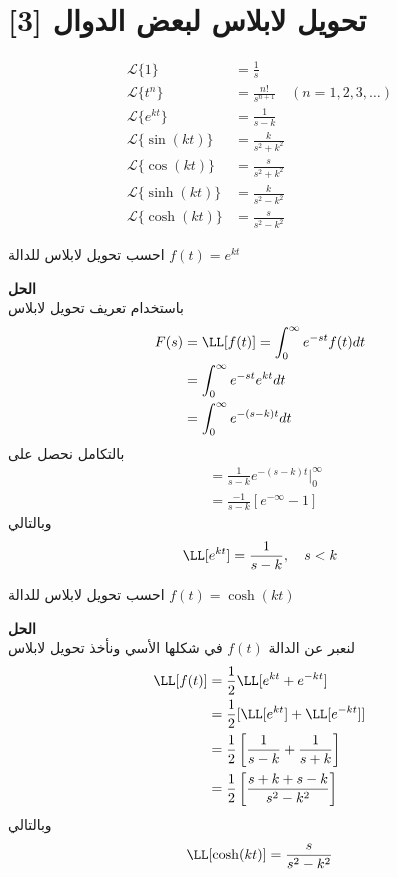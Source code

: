 \section[تحويل لابلاس لبعض الدوال]{تحويل لابلاس لبعض الدوال [3]}
\begin{align}
	\mathcal{L}\{1\}         &= \frac{1}{s}      \\
	\mathcal{L}\{t^n\}       &= \frac{n!}{s^{n+1}}   \quad (n = 1, 2, 3, \dots) \\
	\mathcal{L}\{e^{kt}\}    &= \frac{1}{s-k}        \\
	\mathcal{L}\{\sin(kt)\}  &= \frac{k}{s^2+k^2} \\
	\mathcal{L}\{\cos(kt)\} &= \frac{s}{s^2+k^2}   \\
	\mathcal{L}\{\sinh(kt)\} &= \frac{k}{s^2-k^2}   \\
	\mathcal{L}\{\cosh(kt)\} &= \frac{s}{s^2-k^2}    \
\end{align}

\begin{example}
	احسب تحويل لابلاس للدالة $f(t) = e^{kt}$
\end{example}
\noindent
\textbf{الحل}\\
\noindent
باستخدام تعريف تحويل لابلاس
\begin{align*}
	F(s) &= \LL[f(t)] = \int_{0}^{\infty} e^{-st} f(t) dt\\
	&= \int_{0}^{\infty} e^{-st} e^{kt} dt\\
	&= \int_{0}^{\infty} e^{-(s-k)t}dt
\end{align*}
بالتكامل نحصل على
\begin{align*}
	&= \frac{1}{s-k} e^{-(s-k)t}\Big|^\infty_0\\
	&= \frac{-1}{s-k} [e^{-\infty} -1]
\end{align*}
وبالتالي
\[
\LL[e^{kt}] = \frac{1}{s-k}, \quad s < k
\]

\begin{example}
	احسب تحويل لابلاس للدالة $f(t) = \cosh(kt)$
\end{example}
\noindent
\textbf{الحل}\\
\noindent
لنعبر عن الدالة $f(t)$ في شكلها الأسي ونأخذ تحويل لابلاس
\begin{align*}
	\LL[f(t)] &= \frac{1}{2}\LL[e^{kt} + e^{-kt}]\\
	&= \frac{1}{2} [\LL[e^{kt}] + \LL[e^{-kt}]]\\
	&= \frac{1}{2} \left[\frac{1}{s-k} + \frac{1}{s+k}\right]\\
	&= \frac{1}{2}\left[\frac{s+k+s-k}{s^2-k^2}\right]
\end{align*}
وبالتالي
\[
\LL[\cosh(kt)] = \frac{s}{s^2-k^2}
\]

